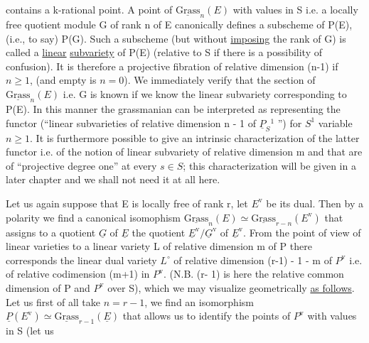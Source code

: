 
contains a k-rational point.  A point of $\underline{\mathrm{Grass}}_{n}(E)$ with values in S
i.e. a locally free quotient module G of rank n of E canonically
defines a subscheme of P(E), (i.e., to say) P(G).  Such a
subscheme (but without \uline{imposing} the rank of G) is called a \uline{linear}
\uline{subvariety} of P(E) (relative to S if there is a possibility of
confusion).  It is therefore a projective fibration of relative
dimension (n-1) if $n \geq 1$, (and empty is $n = 0$).  We immediately
verify that the section of $\underline{\mathrm{Grass}}_{n}(E)$ i.e. G is known if we know the
linear subvariety corresponding to P(E).  In this manner the
grassmanian can be interpreted as representing the functor
(``linear subvarieties of relative dimension n - 1 of $\underline{P}_{S}{}^{1}$ '') for $S^{1}$
variable $n \geq 1$.  It is furthermore possible to give an intrinsic
characterization of the latter functor i.e. of the notion of
linear subvariety of relative dimension m and that are of
``projective degree one'' at every $s \in S$; this characterization will
be given in a later chapter and we shall not need it at all here.

Let us again suppose that E is locally free of rank r, let $E^{\mathrm{v}}$
be its dual.  Then by a polarity we find a canonical isomophism
$\underline{\mathrm{Grass}}_{n}(E) \simeq \underline{\mathrm{Grass}}_{r-n}(E^{\mathrm{v}})$ that assigns to a quotient $\underline{G}$ of $\underline{E}$ the
quotient $\underline{E}^{\mathrm{v}}/\underline{G}^{\mathrm{v}}$ of $\underline{E}^{\mathrm{v}}$.  From the point of view of linear varieties
to a linear variety L of relative dimension m of P there
corresponds the linear dual variety $L^{\circ}$ of relative dimension (r-1)
- 1 - m of $P^{\mathrm{v}}$ i.e. of relative codimension (m+1) in $P^{\mathrm{v}}$.  (N.B. (r-%
1) is here the relative common dimension of P and $P^{\mathrm{v}}$ over S), which
we may visualize geometrically \uline{as follows}.  Let us first of all
take $n = r - 1$, we find an isomorphism $\underline{P}(E^{\mathrm{v}}) \simeq \underline{\mathrm{Grass}}_{r-1}(\underline{E})$ that
allows us to identify the points of $P^{\mathrm{v}}$ with values in S (let us
